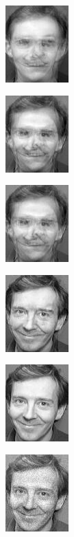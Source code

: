 \documentclass[a4paper]{article}
\begin{document}
\includegraphics[scale=0.500000]{NewPartRecon1.jpg}

\includegraphics[scale=0.500000]{NewPartRecon2.jpg}

\includegraphics[scale=0.500000]{NewPartRecon3.jpg}

\includegraphics[scale=0.500000]{NewPartRecon4.jpg}

\includegraphics[scale=0.500000]{NewPartRecon5.jpg}

\includegraphics[scale=0.500000]{NewPartRecon6.jpg}
\end{document}

